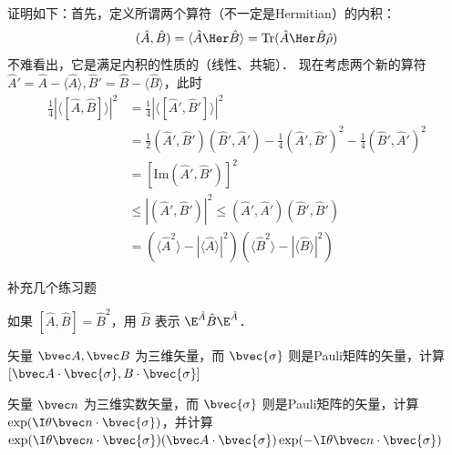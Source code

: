 证明如下：首先，定义所谓两个算符（不一定是Hermitian）的内积：
\begin{equation}
(\hat A, \hat B)=\langle\hat A\Her\hat B\rangle = \text{Tr}(\hat A\Her\hat B\hat\rho)
\end{equation}
不难看出，它是满足内积的性质的（线性、共轭）．
现在考虑两个新的算符 $\hat A'=\hat A-\langle\hat A\rangle, \hat B'=\hat B-\langle\hat B\rangle$，此时
\begin{equation}
\begin{split}
\frac{1}{4}|\langle[\hat A,\hat B]\rangle|^2&=\frac{1}{4}|\langle[\hat A',\hat B']\rangle|^2 \\
&=\frac{1}{2}(\hat A',\hat B')(\hat B',\hat A')-\frac{1}{4}(\hat A',\hat B')^2-\frac{1}{4}(\hat B',\hat A')^2\\
&=[\text{Im}(\hat A',\hat B')]^2\\
&\le |(\hat A',\hat B')|^2\le(\hat A',\hat A')(\hat B',\hat B')\\
&=(\langle\hat A^2\rangle - |\langle\hat A\rangle|^2)(\langle\hat B^2\rangle - |\langle\hat B\rangle|^2)
\end{split}
\end{equation}

补充几个练习题

\begin{exercise}{}
如果 $[\hat A,\hat B]=\hat B^2$，用 $\hat B$ 表示 $\E^{\hat A}\hat B \E^{\hat A}$．
\end{exercise}

\begin{exercise}{}
矢量 $\bvec A, \bvec B$ 为三维矢量，而 $\bvec{\sigma}$ 则是Pauli矩阵的矢量，计算 $[\bvec A\cdot\bvec{\sigma}, B\cdot\bvec{\sigma}]$
\end{exercise}

\begin{exercise}{}
矢量 $\bvec n$ 为三维实数矢量，而 $\bvec{\sigma}$ 则是Pauli矩阵的矢量，计算 $\exp(\I\theta\bvec n\cdot\bvec{\sigma})$，并计算 $\exp(\I\theta\bvec n\cdot\bvec{\sigma})(\bvec A\cdot\bvec{\sigma})\exp(-\I\theta\bvec n\cdot\bvec{\sigma})$
\end{exercise}